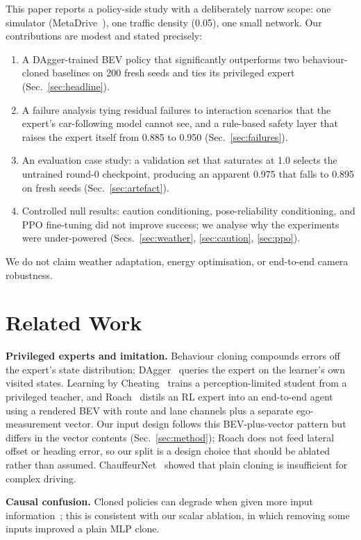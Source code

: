\documentclass[conference]{IEEEtran}
\begin{document}
This paper reports a policy-side study with a deliberately narrow scope: one simulator (MetaDrive~\cite{li2022metadrive}), one traffic density (0.05), one small network. Our contributions are modest and stated precisely:
\begin{enumerate}
\item A DAgger-trained BEV policy that significantly outperforms two behaviour-cloned baselines on 200 fresh seeds and ties its privileged expert (Sec.~\ref{sec:headline}).
\item A failure analysis tying residual failures to interaction scenarios that the expert's car-following model cannot see, and a rule-based safety layer that raises the expert itself from 0.885 to 0.950 (Sec.~\ref{sec:failures}).
\item An evaluation case study: a validation set that saturates at 1.0 selects the untrained round-0 checkpoint, producing an apparent 0.975 that falls to 0.895 on fresh seeds (Sec.~\ref{sec:artefact}).
\item Controlled null results: caution conditioning, pose-reliability conditioning, and PPO fine-tuning did not improve success; we analyse why the experiments were under-powered (Secs.~\ref{sec:weather}, \ref{sec:caution}, \ref{sec:ppo}).
\end{enumerate}
We do not claim weather adaptation, energy optimisation, or end-to-end camera robustness.

\section{Related Work}
\textbf{Privileged experts and imitation.} Behaviour cloning compounds errors off the expert's state distribution; DAgger~\cite{ross2011dagger} queries the expert on the learner's own visited states. Learning by Cheating~\cite{chen2019lbc} trains a perception-limited student from a privileged teacher, and Roach~\cite{zhang2021roach} distils an RL expert into an end-to-end agent using a rendered BEV with route and lane channels plus a separate ego-measurement vector. Our input design follows this BEV-plus-vector pattern but differs in the vector contents (Sec.~\ref{sec:method}); Roach does not feed lateral offset or heading error, so our split is a design choice that should be ablated rather than assumed. ChauffeurNet~\cite{bansal2019chauffeurnet} showed that plain cloning is insufficient for complex driving.

\textbf{Causal confusion.} Cloned policies can degrade when given more input information~\cite{dehaan2019causal}; this is consistent with our scalar ablation, in which removing some inputs improved a plain MLP clone.
\end{document}
